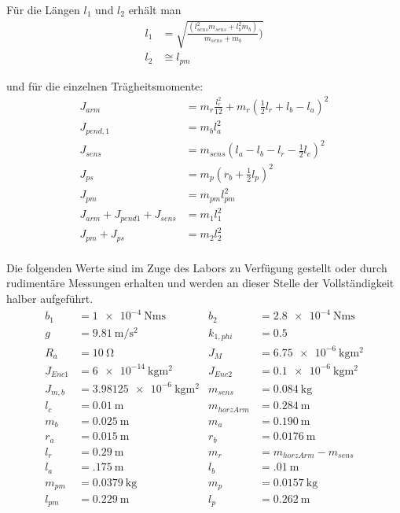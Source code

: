 Für die Längen $l_1$ und $l_2$ erhält man
\begin{align*}
l_1 &= \sqrt{\frac{(l_{sens}^2 \dot m_{sens}+l_b^2 \dot m_b)}{m_{sens} + m_b})} \\
l_2 &\cong l_{pm}
\end{align*}

und für die einzelnen Trägheitsmomente:
\begin{align*}
J_{arm} &= m_r \frac{l^2_r}{12}+m_r(\frac{1}{2}l_r+l_b-l_a)^2 \\
J_{pend,1} &= m_bl^2_a \\
J_{sens} &= m_{sens}(l_a-l_b-l_r-\frac{1}{2}l_c)^2 \\
J_{ps} &= m_p(r_b+\frac{1}{2}l_p)^2 \\
J_{pm} &= m_{pm}l^2_{pm} \\
J_{arm}+J_{pend1}+J_{sens} &= m_1l^2_1 \\ 
J_{pm}+J_{ps} &= m_2l^2_2 \\
\end{align*}

Die folgenden Werte sind im Zuge des Labors zu Verfügung gestellt oder durch rudimentäre Messungen erhalten und werden an dieser Stelle der Vollständigkeit halber aufgeführt. 
\begin{align*}
b_1 &= \SI{1e-4}{\newton\metre\second} &
b_2 &= \SI{2.8e-4}{\newton\metre\second} \\
g &= \SI{9.81}{\metre\per\square\second} &
k_{1,phi} &= \SI{0.5}{}\\
R_a &= \SI{10}{\ohm} &
J_M  &=  \SI{6.75e-6}{\kilo\gram\square\metre}  \\        %
J_{Enc1}  &=  \SI{6e-14}{\kilo\gram\square\metre}  &        %
J_{Enc2}  &=  \SI{0.1e-6}{\kilo\gram\square\metre}  \\     %
J_{m,b}  &=  \SI{3.98125e-6}{\kilo\gram\square\metre}  &     %
m_{sens}  &=  \SI{0.084}{\kilo\gram}  \\
l_c  &=  \SI{0.01}{\metre}  &
m_{horzArm} &= \SI{0.284}{\metre} \\
m_b &= \SI{0.025}{\metre}  &
m_a &= \SI{0.190}{\metre} \\
r_a &= \SI{0.015}{\metre}  &
r_b &= \SI{0.0176}{\metre} \\
l_r &= \SI{0.29}{\metre} &
m_r  &=  m_{horzArm} - m_{sens}\\
l_a &= \SI{.175}{\metre} &
l_b &= \SI{.01}{\metre}\\
m_{pm} &= \SI{0.0379}{\kilo\gram} &
m_p &= \SI{0.0157}{\kilo\gram}\\
l_{pm} &= \SI{0.229}{\metre} &
l_p &= \SI{0.262}{\metre}\\
\end{align*}

